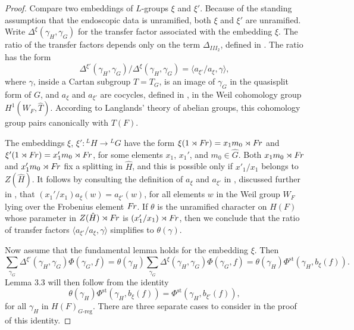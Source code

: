 \documentclass{amsart}
\newcommand\Fr{\text{$F\hskip-.1em r$}}
\begin{document}
\begin{proof}
Compare two embeddings of $L$-groups $\xi$ and $\xi'$.  Because
of the standing assumption that the endoscopic data is unramified,
both $\xi$ and $\xi'$ are unramified.
Write $\Delta^\xi(\gamma_H,\gamma_G)$ for
the transfer factor associated with the embedding $\xi$.
The ratio of the transfer factors depends only on the
term $\Delta_{III_2}$, defined in \cite{LS1}.  The ratio
has the form
$$\Delta^{\xi'}(\gamma_H,\gamma_G)/\Delta^{\xi}(\gamma_H,\gamma_G) =
   \langle a_{\xi'}/a_\xi,\gamma\rangle,$$
where $\gamma$, inside a Cartan subgroup $T=T_G$, is an image
of $\gamma_G$ in the quasisplit form of $G$, and $a_\xi$ and
$a_{\xi'}$ are cocycles, defined in \cite{LS1}, in the Weil cohomology
group $H^1(W_F,\hat T)$.  According to Langlands' theory of
abelian groups, this cohomology group pairs canonically
with $T(F)$.

The embeddings $\xi$, $\xi':{}^L\!H\to {}^L\!G$ have the form $\xi(1\rtimes \Fr) =
x_1m_0\rtimes \Fr$ and $\xi'(1\rtimes \Fr) = x_1'm_0\rtimes \Fr$,
for some elements $x_1$, $x_1'$, and  $m_0\in \hat G$.  Both $x_1m_0\rtimes\Fr$
and $x_1'm_0\rtimes \Fr$ fix a splitting in $\hat H$, and this
is possible only if $x'_1/x_1$ belongs to $Z(\hat H)$.  It follows by
consulting the definition of $a_\xi$ and $a_{\xi'}$ in \cite{LS1},
discussed further in \cite{H2},
that $(x_1'/x_1)a_\xi(w) = a_{\xi'}(w)$, for all elements $w$ in the
Weil group $W_F$ lying over the Frobenius element $\Fr$.  If
$\theta$ is the unramified character on $H(F)$ whose parameter
in $Z(\hat H)\rtimes \Fr$ is $(x_1'/x_1)\rtimes \Fr$, then we
conclude that the ratio of transfer factors 
$\langle a_{\xi'}/a_\xi,\gamma\rangle$ simplifies to $\theta(\gamma)$.

Now assume that the fundamental lemma holds for the
embedding $\xi$.  Then
$$\sum_{\gamma_G} \Delta^{\xi'}(\gamma_H,\gamma_G)
  \Phi(\gamma_G,f) = \theta(\gamma_H)
  \sum_{\gamma_G}\Delta^\xi(\gamma_H,\gamma_G)
  \Phi(\gamma_G,f) = \theta(\gamma_H)\Phi^{\text{st}}(\gamma_H,b_\xi(f)).$$
Lemma 3.3 will then follow from the identity
\begin{equation}\tag{*}
 \theta(\gamma_H)\Phi^{\text{st}}(\gamma_H,b_\xi(f)) =
  \Phi^{\text{st}}(\gamma_H,b_{\xi'}(f)),
\end{equation}
  for all $\gamma_H$ in $H(F)_{G\text{-reg}}$.
There are three separate cases to consider in the
proof of this identity.


\end{proof}
\end{document}
